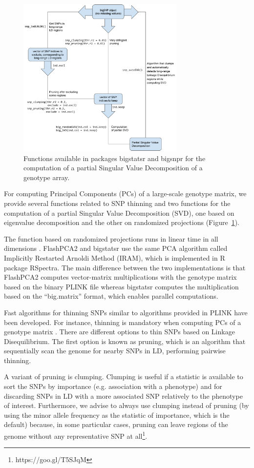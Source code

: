 \documentclass{bioinfo}
\begin{document}
\begin{figure}[!tpb]
\centerline{\includegraphics[width=235pt]{svd.pdf}}
\caption{Functions available in packages bigstatsr and bigsnpr for the computation of a partial Singular Value Decomposition of a genotype array.}\label{fig:svd}
\end{figure}

For computing Principal Components (PCs) of a large-scale genotype matrix, we provide several functions related to SNP thinning and two functions for the computation of a partial Singular Value Decomposition (SVD), one based on eigenvalue decomposition and the other on randomized projections (Figure~\ref{fig:svd}).

The function based on randomized projections runs in linear time in all dimensions \cite[]{Lehoucq1996}. FlashPCA2 and bigstatsr use the same PCA algorithm called Implicitly Restarted Arnoldi Method (IRAM), which is implemented in R package RSpectra. The main difference between the two implementations is that FlashPCA2 computes vector-matrix multiplications with the genotype matrix based on the binary PLINK file whereas bigstatsr computes the multiplication based on the ``big.matrix'' format, which enables parallel computations. 
 
Fast algorithms for thinning SNPs  similar to algorithms provided in PLINK have been developed. For instance, thinning is mandatory when computing PCs of a genotype matrix \cite[]{Abdellaoui2013}. There are different options to thin SNPs based on Linkage Disequilibrium. The first option is known as pruning, which is an algorithm that sequentially scan the genome for nearby SNPs in LD, performing pairwise thinning.

A variant of pruning is clumping. Clumping is useful if a statistic is available to sort the SNPs by importance (e.g. association with a phenotype) and for discarding SNPs in LD with a more associated SNP relatively to the phenotype of interest. Furthermore, we advise to always use clumping instead of pruning (by using the minor allele frequency as the statistic of importance, which is the default) because, in some particular cases, pruning can leave regions of the genome without any representative SNP at all\footnote{https://goo.gl/T5SJqM}.
\end{document}
